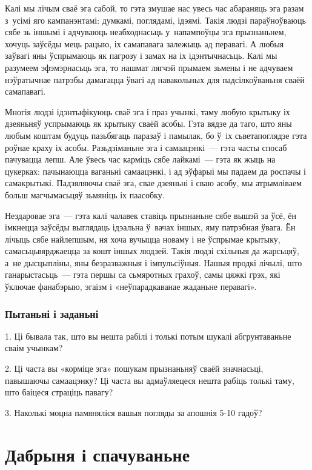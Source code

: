 Калі мы лічым сваё эга сабой, то гэта змушае нас увесь час абараняць эга разам з~усімі яго кампанэнтамі: думкамі, поглядамі, ідэямі. Такія людзі параўноўваюць сябе зь іншымі і адчуваюць неабходнасьць у~напампоўцы эга прызнаньнем, хочуць заўсёды мець рацыю, іх самапавага залежыць ад перавагі. А любыя заўвагі яны ўспрымаюць як пагрозу і замах на іх ідэнтычнасьць. Калі мы разумеем эфэмэрнасьць эга, то нашмат лягчэй прымаем зьмены і не адчуваем нэўратычнае патрэбы дамагацца ўвагі ад навакольных для падсілкоўваньня сваёй самапавагі.

Многія людзі ідэнтыфікуюць сваё эга і праз учынкі, таму любую крытыку іх дзеяньняў успрымаюць як крытыку сваёй асобы. Гэта вядзе да таго, што яны любым коштам будуць пазьбягаць паразаў і памылак, бо ў~іх сьветапоглядзе гэта роўнае краху іх асобы. Разьдзіманьне эга і самаацэнкі~--- гэта часты спосаб пачувацца лепш. Але ўвесь час карміць сябе лайкамі~--- гэта як жыць на цукерках: пачынаюцца ваганьні самаацэнкі, і ад эўфарыі мы падаем да роспачы і самакрытыкі. Падзяляючы сваё эга, свае дзеяньні і сваю асобу, мы атрымліваем больш магчымасьцяў зьмяніць іх паасобку.

Нездаровае эга~--- гэта калі чалавек ставіць прызнаньне сябе вышэй за ўсё, ён імкнецца заўсёды выглядаць ідэальна ў~вачах іншых, яму патрэбная ўвага. Ён лічыць сябе найлепшым, ня хоча вучыцца новаму і не ўспрымае крытыку, самасьцьвярджаецца за кошт іншых людзей. Такія людзі схільныя да жарсьцяў, а~не дысцыпліны, яны безразважныя і імпульсіўныя. Нашыя продкі лічылі, што ганарыстасьць~--- гэта першы са сьмяротных грахоў, самы цяжкі грэх, які ўключае фанабэрыю, эгаізм і «неўпарадкаванае жаданьне перавагі».

\subsubsection{Пытаньні і заданьні}

1. Ці бывала так, што вы нешта рабілі і толькі потым шукалі абгрунтаваньне сваім учынкам?

2. Ці часта вы «корміце эга» пошукам прызнаньняў сваёй значнасьці, павышаючы самаацэнку? Ці часта вы адмаўляецеся нешта рабіць толькі таму, што баіцеся страціць павагу?

3. Наколькі моцна памяняліся вашыя погляды за апошнія 5-10 гадоў?


\section{Дабрыня і спачуваньне}

